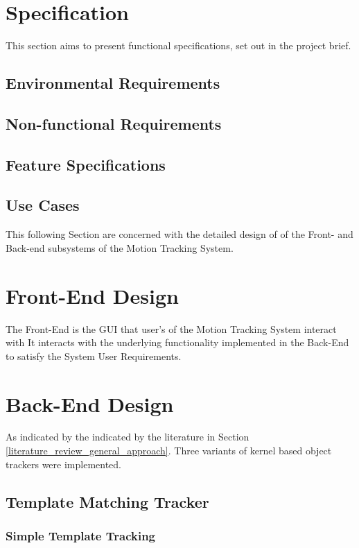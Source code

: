 \section{Specification}
This section aims to present functional specifications, set out in the
project brief.

\subsection{Environmental Requirements}


\subsection{Non-functional Requirements}


\subsection{Feature Specifications}


\subsection{Use Cases}


This following Section are concerned with the detailed design of of the Front- and Back-end
subsystems of the Motion Tracking System.

\section{Front-End Design}
The Front-End is the GUI that user's of the Motion Tracking System interact with 
It interacts with the underlying functionality implemented in the Back-End to
satisfy the System User Requirements. 

\section{Back-End Design}
As indicated by the indicated by the literature in Section
\ref{literature_review_general_approach}. Three variants of kernel based object
trackers were implemented.

\subsection{Template Matching Tracker}

\subsubsection{Simple Template Tracking}

